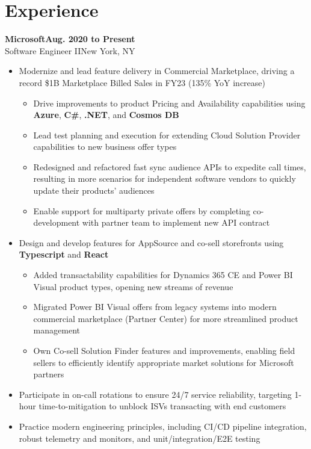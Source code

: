 \documentclass[9pt]{extarticle}
\newcommand{\experiencesubsection}[4]{
    \vspace{0.75em}\Large\textbf{#1\hfill{#4}}\\{#2}\hfill{#3}\normalsize
}
\begin{document}
\hfill\begin{minipage}[t]{.7\textwidth}  %
    \section{Experience}
    \experiencesubsection{Microsoft}{Software Engineer II}{New York, NY}{Aug. 2020 to Present}
    \begin{itemize}
        \setlength\itemsep{1dd}
        \item Modernize and lead feature delivery in Commercial Marketplace, driving a record \$1B Marketplace Billed Sales in FY23 (135\% YoY increase)
            \begin{itemize}[topsep=0pt]
                \setlength\itemsep{1dd}
                \item Drive improvements to product Pricing and Availability capabilities using \textbf{Azure}, \textbf{C\#}, \textbf{.NET}, and \textbf{Cosmos DB}
                \item Lead test planning and execution for extending Cloud Solution Provider capabilities to new business offer types
                \item Redesigned and refactored fast sync audience APIs to expedite call times, resulting in more scenarios for independent
                    software vendors to quickly update their products' audiences
                \item Enable support for multiparty private offers by completing co-development with partner team to implement new API contract
            \end{itemize}
        \item Design and develop features for AppSource and co-sell storefronts using \textbf{Typescript} and \textbf{React}
            \begin{itemize}[topsep=0pt]
                \setlength\itemsep{1dd}
                \item Added transactability capabilities for Dynamics 365 CE and Power BI Visual product types, opening new streams of revenue
                \item Migrated Power BI Visual offers from legacy systems into modern commercial marketplace (Partner Center) for more streamlined product management
                \item Own Co-sell Solution Finder features and improvements, enabling field sellers to efficiently identify appropriate market solutions for Microsoft partners
            \end{itemize}
        \item Participate in on-call rotations to ensure 24/7 service reliability, targeting 1-hour time-to-mitigation to unblock ISVs transacting with end customers
        \item Practice modern engineering principles, including CI/CD pipeline integration, robust telemetry and monitors, and unit/integration/E2E testing 
    \end{itemize}


\end{minipage}
\end{document}
